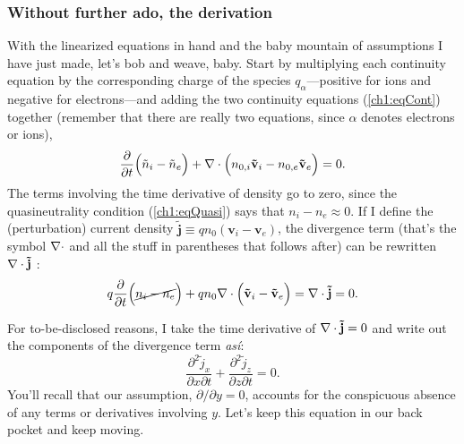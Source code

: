 
\subsubsection{Without further ado, the derivation}

With the linearized equations in hand and the baby mountain of assumptions I
have just made, let's bob and weave, baby. Start by multiplying each continuity
equation by the corresponding charge of the species $q_\alpha$---positive for
ions and negative for electrons---and adding the two continuity equations
(\ref{ch1:eqCont}) together (remember that there are really two equations, since
$\alpha$ denotes electrons or ions),
\begin{equation} \label{ch1:eqCont1} \dfrac{\partial}{\partial t} \Big (
  \tilde n_i - \tilde n_e \Big ) + {\bf \nabla} \cdot \Big (n_{0,i} \mathbf{\tilde v}_i - n_{0,e}
  \mathbf{\tilde v}_{e} \Big ) = 0.
\end{equation}
The terms involving the time derivative of density go to zero, since the
quasineutrality condition (\ref{ch1:eqQuasi}) says that $n_i - n_e \approx
0$. If I define the (perturbation) current density
$\mathbf{\tilde j} \equiv q n_0 ( \mathbf{v}_i - \mathbf{v}_e )$, the divergence
term (that's the symbol ${\bf \nabla} \cdot$ and all the stuff in parentheses that
follows after) can be rewritten ${\bf \nabla} \cdot \mathbf{\tilde j}$ :
\begin{equation*} 
  q\dfrac{\partial}{\partial t} \Big ( \cancel{n_i - n_e} \Big )
  + q n_0 {\bf \nabla} \cdot \Big ( \mathbf{\tilde v}_i - \mathbf{\tilde v}_{e} \Big ) = {\bf \nabla}
  \cdot \mathbf{\tilde j} = 0.
\end{equation*}

For to-be-disclosed reasons, I take the time derivative of ${\bf \nabla} \cdot
\mathbf{\tilde j} = 0$ and write out the components of the divergence term
\emph{as\'{i}}:
\begin{equation} 
  \label{ch1:eqCont2} \dfrac{\partial^2 \tilde j_x}{\partial x \partial t} + \dfrac{\partial^2 \tilde j_z}{\partial z \partial t} = 0.
\end{equation}
You'll recall that our assumption, $\partial / \partial y = 0$, accounts for the
conspicuous absence of any terms or derivatives involving $y$. Let's keep this
equation in our back pocket and keep moving.

